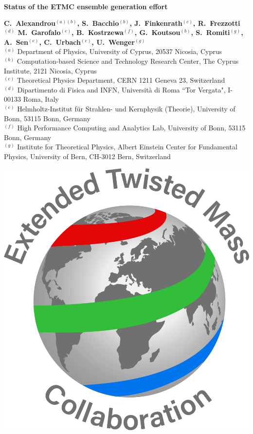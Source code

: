 \documentclass[a0,portrait]{a0poster}
\begin{document}
{\VeryHuge \color{NavyBlue} \textbf{Status of the ETMC ensemble generation effort} \color{Black}\\[1.4cm]} %

\begin{minipage}[b]{0.74\linewidth}
    \Large \textbf{C.~Alexandrou$^{(a)(b)}$, S.~Bacchio$^{(b)}$, J.~Finkenrath$^{(c)}$, R.~Frezzotti$^{(d)}$ M.~Garofalo$^{(e)}$, B.~Kostrzewa$^{(f)}$, G.~Koutsou$^{(b)}$, S.~Romiti$^{(g)}$, A.~Sen$^{(e)}$, C.~Urbach$^{(e)}$, U.~Wenger$^{(g)}$}\\[0.5cm] %
    \large $^{(a)}$ Department of Physics, University of Cyprus, 20537 Nicosia, Cyprus\\
    \large $^{(b)}$ Computation-based Science and Technology Research Center, The Cyprus Institute, 2121 Nicosia, Cyprus\\
    \large $^{(c)}$ Theoretical Physics Department, CERN 1211 Geneva 23, Switzerland\\
    \large $^{(d)}$ Dipartimento di Fisica and INFN, Universit\`a di Roma ``Tor Vergata", I-00133 Roma, Italy\\
    \large $^{(e)}$ Helmholtz-Institut f{\"u}r Strahlen- und Kernphysik (Theorie), University of Bonn, 53115 Bonn, Germany\\
    \large $^{(f)}$ High Performance Computing and Analytics Lab, University of Bonn, 53115 Bonn, Germany\\
    \large $^{(g)}$ Institute for Theoretical Physics, Albert Einstein Center for Fundamental Physics, University of Bern, CH-3012 Bern, Switzerland\\
\end{minipage}
%
\begin{minipage}[b]{0.26\linewidth}
    \includegraphics[width=15cm]{figures/Logo_ETMC_RGB.pdf}
\end{minipage}
\end{document}
